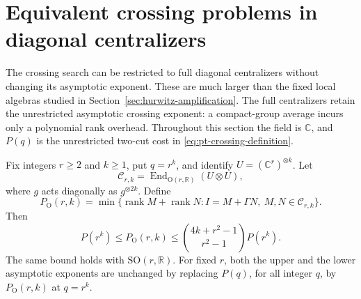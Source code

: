 \section{Equivalent crossing problems in diagonal centralizers}
\label{sec:centralizer-gates}

The crossing search can be restricted to full diagonal centralizers
without changing its asymptotic exponent. These are much larger than
the fixed local algebras studied in Section~\ref{sec:hurwitz-amplification}.
The full centralizers retain the unrestricted
asymptotic crossing exponent: a compact-group average incurs only
a polynomial rank overhead. Throughout this section the field is
$\mathbb C$, and $P(q)$ is the unrestricted two-cut cost in
\eqref{eq:pt-crossing-definition}.

\begin{proposition}
\label{prop:orthogonal-average-gate}
Fix integers $r\ge2$ and $k\ge1$, put $q=r^k$, and identify
$U=(\mathbb C^r)^{\otimes k}$. Let
\[
 \mathcal C_{r,k}=
 \operatorname{End}_{\mathrm O(r,\mathbb R)}(U\otimes U),
\]
where $g$ acts diagonally as $g^{\otimes2k}$. Define
\[
 P_{\mathrm O}(r,k)=
 \min\{\operatorname{rank}M+\operatorname{rank}N:
       I=M+\Gamma N,\ M,N\in\mathcal C_{r,k}\}.
\]
Then
\begin{equation}\label{eq:orthogonal-average-cost}
 P(r^k)\le P_{\mathrm O}(r,k)
 \le\binom{4k+r^2-1}{r^2-1}P(r^k).
\end{equation}
The same bound holds with $\mathrm{SO}(r,\mathbb R)$.
For fixed $r$, both the upper and the lower asymptotic exponents
are unchanged by replacing $P(q)$, for all integer $q$, by
$P_{\mathrm O}(r,k)$ at $q=r^k$.
\end{proposition}


